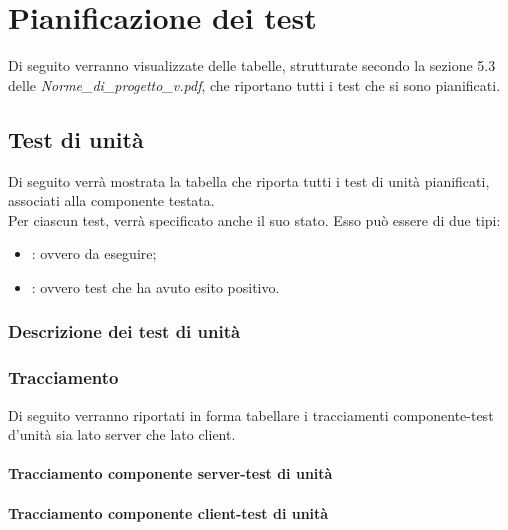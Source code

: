 \newpage
\section{Pianificazione dei test}
Di seguito verranno visualizzate delle tabelle, strutturate secondo la sezione 5.3 delle  \emph{Norme\_di\_progetto\_v\versioneNormeDiProgetto{}.pdf}, che riportano tutti i test che si sono pianificati. \\


\subsection{Test di unità}
Di seguito verrà mostrata la tabella che riporta tutti i test di unità pianificati, associati alla componente testata.\\
Per ciascun test, verrà specificato anche il suo stato. Esso può essere di due tipi:
\begin{itemize}
\item {}: ovvero da eseguire;
\item {}: ovvero test che ha avuto esito positivo.
\end{itemize}
\subsubsection{Descrizione dei test di unità}




\subsubsection{Tracciamento}
Di seguito verranno riportati in forma tabellare i tracciamenti componente-test d'unità sia lato server che lato client.\\


\paragraph{Tracciamento componente server-test di unità}


\paragraph{Tracciamento componente client-test di unità}


